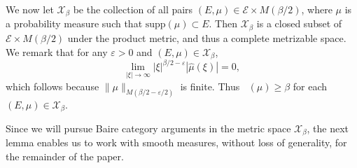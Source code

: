 \documentclass[dvipsnames,letterpaper,12pt]{article}
\numberwithin{equation}{section}
\DeclareMathOperator{\fordim}{\dim_{\mathbf{F}}}
\newtheorem{theorem}{Theorem}
\numberwithin{theorem}{section}
\begin{document}
We now let $\mathcal{X}_\beta$ be the collection of all pairs $(E,\mu) \in \mathcal{E} \times M(\beta/2)$, where $\mu$ is a probability measure such that $\text{supp}(\mu) \subset E$. Then $\mathcal{X}_\beta$ is a closed subset of $\mathcal{E} \times M(\beta/2)$ under the product metric, and thus a complete metrizable space. We remark that for any $\varepsilon > 0$ and $(E,\mu) \in \mathcal{X}_\beta$,
%
\begin{equation} \label{equationGFSCSC4}
    \lim_{|\xi| \to \infty} |\xi|^{\beta/2 - \varepsilon} |\widehat{\mu}(\xi)| = 0,
\end{equation}
%
which follows because $\| \mu \|_{M(\beta/2 - \varepsilon/2)}$ is finite. Thus $\fordim(\mu) \geq \beta$ for each $(E,\mu) \in \mathcal{X}_\beta$.

\begin{comment}
\begin{theorem}
    $\mathcal{X}$ is a closed subset of $\mathcal{E} \times M(\beta)$.
\end{theorem}
\begin{proof}
    Suppose $\{ (E_k,\mu_k) \}$ is a sequence of elements of $\mathcal{X}$ converging to some tuple $(E,\mu) \in \mathcal{E} \times M(\beta)$. Fix $\varepsilon > 0$. Since $E_k \to E$ in the Hausdorff dimension, there exists $k_0$ such that for $k \geq k_0$, $E_k \subset E(\varepsilon)$. Since $\mu_k \to \mu$ weakly, this implies that $\mu$ is a probability measure, and that $\text{supp}(\mu) \subset E(\varepsilon)$. Taking $\varepsilon \to 0$ shows that $\text{supp}(\mu) \subset E$. Again for a fixed $\varepsilon > 0$, applying the triangle inequality and the reverse triangle inequality combined with \eqref{equationGFSCSC4} applied to $\mu_k$, we conclude
    \[ \lim_{|\xi| \to \infty} |\xi|^{\beta/2 - \varepsilon} |\widehat{\mu}(\xi)| = \lim_{|\xi| \to \infty} |\xi|^{\beta/2 - \varepsilon} |\widehat{\mu}(\xi) - \widehat{\mu_k}(\xi)| \leq \| \mu - \mu_k \|_{M(\beta,\varepsilon)}. \]
    Taking $k \to \infty$ shows that
    \[ \lim_{|\xi| \to \infty} |\xi|^{\beta/2 - \varepsilon} |\widehat{\mu}(\xi)| = 0, \]
    which completes the proof.
\end{proof}
\end{comment}

Since we will pursue Baire category arguments in the metric space $\mathcal{X}_\beta$, the next lemma enables us to work with smooth measures, without loss of generality, for the remainder of the paper.
\end{document}
